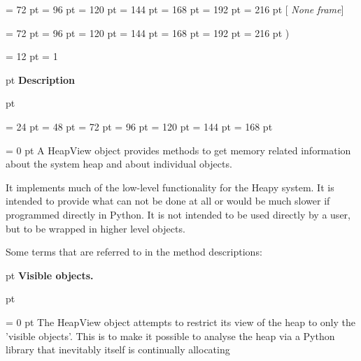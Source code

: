 {{{{{{\par \noindent  \leftskip = 72 pt  \leftmargini = 96 pt  \leftmarginii = 120 pt  \leftmarginiii = 144 pt  \leftmarginiv = 168 pt  \leftmarginv = 192 pt  \leftmarginvi = 216 pt {\bf {}\/}{[} {\em None\/}{\bf {}\/} {\em frame\/}]\par}
{\par \noindent  \leftskip = 72 pt  \leftmargini = 96 pt  \leftmarginii = 120 pt  \leftmarginiii = 144 pt  \leftmarginiv = 168 pt  \leftmarginv = 192 pt  \leftmarginvi = 216 pt  )\par}
\par}
\par}
\par}
\par}
{\par \pagebreak[3.300000] \noindent \hangindent = 12 pt \hangafter = 1 
{\par \pagebreak[3]  pt \noindent
{\Large {\bf Description\/}}\par {} pt
} \noindent
\par}
{\par \noindent  \leftskip = 24 pt  \leftmargini = 48 pt  \leftmarginii = 72 pt  \leftmarginiii = 96 pt  \leftmarginiv = 120 pt  \leftmarginv = 144 pt  \leftmarginvi = 168 pt {\par \parindent = 0 pt 
A HeapView object provides methods to get memory related information
about the system heap and about individual objects.
 \par}
{\par 
It implements much of the low-level functionality for the Heapy
system. It is intended to provide what can not be done at all or would
be much slower if programmed directly in Python. It is not intended to
be used directly by a user, but to be wrapped in higher level objects.
 \par}
{\par 
Some terms that are referred to in the method descriptions:
 \par}
{\par \pagebreak[2]  pt \noindent
{\large {\bf  Visible objects.\/}}\par {} pt
} \noindent
{\par \parindent = 0 pt 
The HeapView object attempts to restrict its view of the heap to only
the 'visible objects'. This is to make it possible to analyse the heap
via a Python library that inevitably itself is continually allocating
}}}
